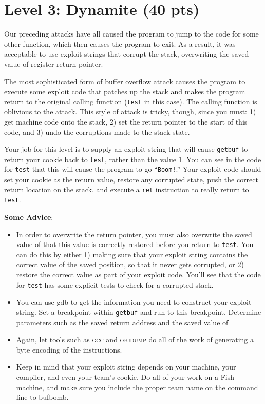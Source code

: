\documentclass[11pt]{article}
\begin{document}
\section*{Level 3: Dynamite (40 pts)}

Our preceding attacks have all caused the program to jump to the code
for some other function, which then causes the program to exit.  As a
result, it was acceptable to use exploit strings that corrupt the
stack, overwriting the saved value of register \verb@%ebp@ and the
return pointer.  

The most sophisticated form of buffer overflow attack causes the
program to execute some exploit code that patches up the stack and
makes the program return to the original calling function
(\texttt{test} in this case).  The calling function is oblivious to
the attack.  This style of attack is tricky, though, since you must:
1) get machine code onto the stack, 2) set the return pointer to the
start of this code, and 3) undo the corruptions made to the stack
state.

Your job for this level is to supply an exploit string that will cause
{\tt getbuf} to return your cookie back to \texttt{test}, rather than
the value 1.  You can see in the code for {\tt test} that this will
cause the program to go ``{\tt Boom!}.''  Your exploit code should set
your cookie as the return value, restore any corrupted state, push the
correct return location on the stack, and execute a {\tt ret}
instruction to really return to {\tt test}.

{\bf Some Advice}:
\begin{itemize}
\item In order to overwrite the return pointer, you must also
overwrite the saved value of \verb@%ebp@.  However, it is important
that this value is correctly restored before you return to {\tt test}.
You can do this by either 1) making sure that your exploit string
contains the correct value of the saved \verb@%ebp@ in the correct
position, so that it never gets corrupted, or 2) restore the correct
value as part of your exploit code.  You'll see that the code for
\texttt{test} has some explicit tests to check for a corrupted stack.
\item 
You can use {\sc gdb} to get the information you need to construct
your exploit string.  Set a breakpoint within {\tt getbuf} and run to
this breakpoint.  Determine parameters such as the saved return
address and the saved value of \verb@%ebp@.
\item
Again, let tools such as \textsc{gcc} and \textsc{objdump} do all of
the work of generating a byte encoding of the instructions.
\item
Keep in mind that your exploit string depends on your machine, your
compiler, and even your team's cookie.  Do all of your work on a Fish
machine, and make sure you include the proper team name on the command line
to {\sc bufbomb}.
\end{itemize}
\end{document}
